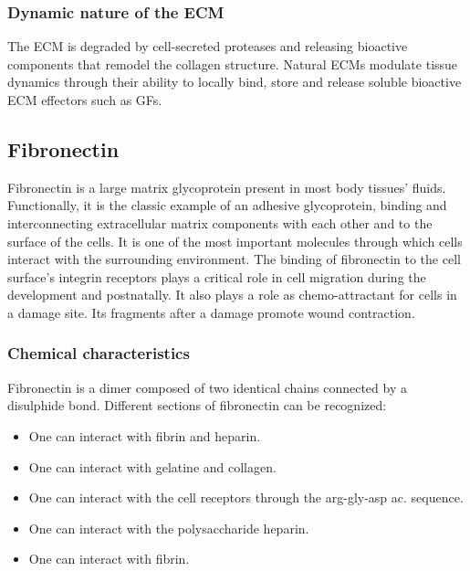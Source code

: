 		\subsubsection{Dynamic nature of the ECM}
		The ECM is degraded by cell-secreted proteases and releasing bioactive components that remodel the collagen structure.
		Natural ECMs modulate tissue dynamics through their ability to locally bind, store and release soluble bioactive ECM effectors such as GFs.

	\subsection{Fibronectin}
	Fibronectin is a large matrix glycoprotein present in most body tissues' fluids.
	Functionally, it is the classic example of an adhesive glycoprotein, binding and interconnecting extracellular matrix components with each other and to the surface of the cells.
	It is one of the most important molecules through which cells interact with the surrounding environment.
	The binding of fibronectin to the cell surface’s integrin receptors plays a critical role in cell migration during the development and postnatally.
	It also plays a role as chemo-attractant for cells in a damage site.
	Its fragments after a damage promote wound contraction.


		\subsubsection{Chemical characteristics}
	Fibronectin is a dimer composed of two identical chains connected by a disulphide bond.
	Different sections of fibronectin can be recognized:

	\begin{multicols}{2}
		\begin{itemize}
			\item One can interact with fibrin and heparin.
			\item One can interact with gelatine and collagen.
			\item One can interact with the cell receptors through the arg-gly-asp ac. sequence.
			\item One can interact with the polysaccharide heparin.
			\item One can interact with fibrin.
		\end{itemize}
	\end{multicols}

